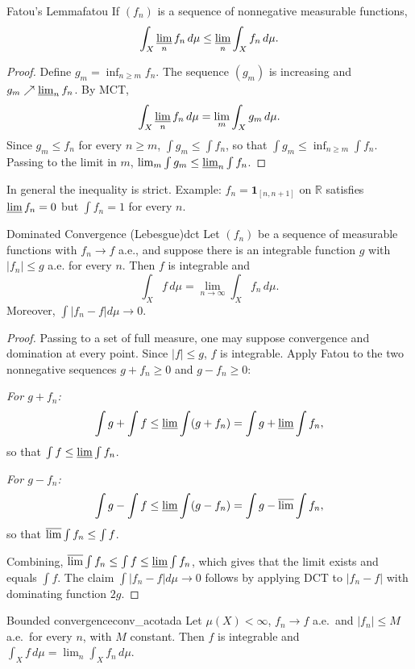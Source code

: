 \documentclass[11pt, a4paper]{article}
\begin{document}
\begin{teorema}{Fatou's Lemma}{fatou}
If $(f_n)$ is a sequence of nonnegative measurable functions,
$$ \int_X \varliminf_n f_n \, d\mu \le \varliminf_n \int_X f_n \, d\mu. $$
\end{teorema}

\begin{proof}
Define $g_m = \inf_{n \ge m} f_n$. The sequence $(g_m)$ is increasing and $g_m \nearrow
\varliminf_n f_n$. By MCT,
$$ \int_X \varliminf_n f_n \, d\mu = \lim_m \int_X g_m \, d\mu. $$
Since $g_m \le f_n$ for every $n \ge m$, $\int g_m \le \int f_n$, so that
$\int g_m \le \inf_{n \ge m} \int f_n$. Passing to the limit in $m$,
$\lim_m \int g_m \le \varliminf_n \int f_n$.
\end{proof}

\obs In general the inequality is strict. Example: $f_n = \mathbf{1}_{[n, n+1]}$ on $\mathbb{R}$
satisfies $\varliminf f_n = 0$ but $\int f_n = 1$ for every $n$.

\begin{teorema}{Dominated Convergence (Lebesgue)}{dct}
Let $(f_n)$ be a sequence of measurable functions with $f_n \to f$ a.e., and suppose there is
an integrable function $g$ with $|f_n| \le g$ a.e. for every $n$. Then $f$ is integrable and
$$ \int_X f \, d\mu = \lim_{n \to \infty} \int_X f_n \, d\mu. $$
Moreover, $\int |f_n - f| d\mu \to 0$.
\end{teorema}

\begin{proof}
Passing to a set of full measure, one may suppose convergence and domination at every point.
Since $|f| \le g$, $f$ is integrable. Apply Fatou to the two nonnegative sequences
$g + f_n \ge 0$ and $g - f_n \ge 0$:

\textit{For $g + f_n$:}
$$ \int g + \int f \le \varliminf \int (g + f_n) = \int g + \varliminf \int f_n, $$
so that $\int f \le \varliminf \int f_n$.

\textit{For $g - f_n$:}
$$ \int g - \int f \le \varliminf \int (g - f_n) = \int g - \varlimsup \int f_n, $$
so that $\varlimsup \int f_n \le \int f$.

Combining, $\varlimsup \int f_n \le \int f \le \varliminf \int f_n$, which gives that the limit
exists and equals $\int f$. The claim $\int|f_n - f| d\mu \to 0$ follows by applying DCT to
$|f_n - f|$ with dominating function $2g$.
\end{proof}

\begin{corolario}{Bounded convergence}{conv_acotada}
Let $\mu(X) < \infty$, $f_n \to f$ a.e.\ and $|f_n| \le M$ a.e.\ for every $n$, with $M$
constant. Then $f$ is integrable and $\int_X f \, d\mu = \lim_n \int_X f_n \, d\mu$.
\end{corolario}
\end{document}
